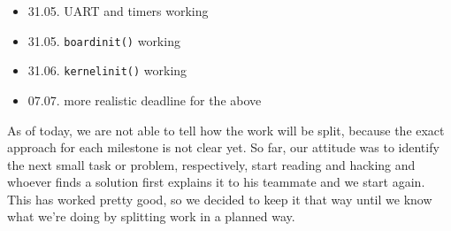 \documentclass[conference,a4paper]{IEEEtran}
\begin{document}
\begin{itemize}
 \item 31.05. UART and timers working
 \item 31.05. \texttt{board\underbar{ }init()} working
 \item 31.06. \texttt{kernel\underbar{ }init()} working
 \item 07.07. more realistic deadline for the above
\end{itemize}

As of today, we are not able to tell how the work will be split, because the 
exact approach for each milestone is not clear yet. So far, our attitude was to 
identify the next small task or problem, respectively, start reading and 
hacking and whoever finds a solution first explains it to his teammate and we 
start again. This has worked pretty good, so we decided to keep it that way 
until we know what we're doing by splitting work in a planned way.





% 
% 
\end{document}
